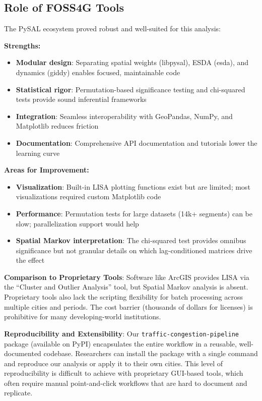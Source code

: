 \documentclass[11pt,a4paper]{article}
\begin{document}
\subsection{Role of FOSS4G Tools}

The PySAL ecosystem proved robust and well-suited for this analysis:

\textbf{Strengths:}
\begin{itemize}
    \item \textbf{Modular design}: Separating spatial weights (libpysal), ESDA (esda), and dynamics (giddy) enables focused, maintainable code
    \item \textbf{Statistical rigor}: Permutation-based significance testing and chi-squared tests provide sound inferential frameworks
    \item \textbf{Integration}: Seamless interoperability with GeoPandas, NumPy, and Matplotlib reduces friction
    \item \textbf{Documentation}: Comprehensive API documentation and tutorials lower the learning curve
\end{itemize}

\textbf{Areas for Improvement:}
\begin{itemize}
    \item \textbf{Visualization}: Built-in LISA plotting functions exist but are limited; most visualizations required custom Matplotlib code
    \item \textbf{Performance}: Permutation tests for large datasets (14k+ segments) can be slow; parallelization support would help
    \item \textbf{Spatial Markov interpretation}: The chi-squared test provides omnibus significance but not granular details on which lag-conditioned matrices drive the effect
\end{itemize}

\textbf{Comparison to Proprietary Tools}: Software like ArcGIS provides LISA via the ``Cluster and Outlier Analysis'' tool, but Spatial Markov analysis is absent. Proprietary tools also lack the scripting flexibility for batch processing across multiple cities and periods. The cost barrier (thousands of dollars for licenses) is prohibitive for many developing-world institutions.

\textbf{Reproducibility and Extensibility}: Our \texttt{traffic-congestion-pipeline} package (available on PyPI) encapsulates the entire workflow in a reusable, well-documented codebase. Researchers can install the package with a single command and reproduce our analysis or apply it to their own cities. This level of reproducibility is difficult to achieve with proprietary GUI-based tools, which often require manual point-and-click workflows that are hard to document and replicate.
\end{document}
